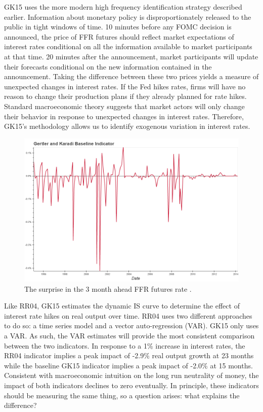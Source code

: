 \documentclass[a4paper,man,floatsintext,natbib]{apa6}
\begin{document}
	GK15 uses the more modern high frequency identification strategy described earlier. Information about monetary policy is disproportionately released to the public in tight windows of time. 10 minutes before any FOMC decision is announced, the price of FFR futures should reflect market expectations of interest rates conditional on all the information available to market participants at that time. 20 minutes after the announcement, market participants will update their forecasts conditional on the new information contained in the announcement. Taking the difference between these two prices yields a measure of unexpected changes in interest rates. If the Fed hikes rates, firms will have no reason to change their production plans if they already planned for rate hikes. Standard macroeconomic theory suggests that market actors will only change their behavior in response to unexpected changes in interest rates. Therefore, GK15's methodology allows us to identify exogenous variation in interest rates.
	\begin{figure}
		\centering
		\includegraphics[width=\textwidth]{charts/gk15.png}
		\caption{\label{gk15} The surprise in the 3 month ahead FFR futures rate \citep{Gertler2015}.}
	\end{figure}
	
	Like RR04, GK15 estimates the dynamic IS curve to determine the effect of interest rate hikes on real output over time. RR04 uses two different approaches to do so: a time series model and a vector auto-regression (VAR). GK15 only uses a VAR. As such, the VAR estimates will provide the most consistent comparison between the two indicators. In response to a 1\% increase in interest rates, the RR04 indicator implies a peak impact of -2.9\% real output growth at 23 months while the baseline GK15 indicator implies a peak impact of -2.0\% at 15 months. Consistent with macroeconomic intuition on the long run neutrality of money, the impact of both indicators declines to zero eventually. In principle, these indicators should be measuring the same thing, so a question arises: what explains the difference?  
	
\end{document}

